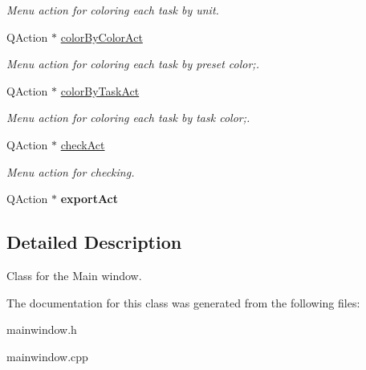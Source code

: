 \begin{DoxyCompactItemize}
\begin{DoxyCompactList}\small\item\em Menu action for coloring each task by unit. \end{DoxyCompactList}\item 
\hypertarget{class_main_window_afd6cf07dd21a8cde228102b8798ac49d}{}Q\+Action $\ast$ \hyperlink{class_main_window_afd6cf07dd21a8cde228102b8798ac49d}{color\+By\+Color\+Act}\label{class_main_window_afd6cf07dd21a8cde228102b8798ac49d}

\begin{DoxyCompactList}\small\item\em Menu action for coloring each task by preset color;. \end{DoxyCompactList}\item 
\hypertarget{class_main_window_a4c72320ca62b13088dc5ca562cba2761}{}Q\+Action $\ast$ \hyperlink{class_main_window_a4c72320ca62b13088dc5ca562cba2761}{color\+By\+Task\+Act}\label{class_main_window_a4c72320ca62b13088dc5ca562cba2761}

\begin{DoxyCompactList}\small\item\em Menu action for coloring each task by task color;. \end{DoxyCompactList}\item 
\hypertarget{class_main_window_ab6bb74007a03a6d6e97fa3b4c92cd0da}{}Q\+Action $\ast$ \hyperlink{class_main_window_ab6bb74007a03a6d6e97fa3b4c92cd0da}{check\+Act}\label{class_main_window_ab6bb74007a03a6d6e97fa3b4c92cd0da}

\begin{DoxyCompactList}\small\item\em Menu action for checking. \end{DoxyCompactList}\item 
\hypertarget{class_main_window_acb019ac85cd188f2738421da7095e932}{}Q\+Action $\ast$ {\bfseries export\+Act}\label{class_main_window_acb019ac85cd188f2738421da7095e932}

\end{DoxyCompactItemize}


\subsection{Detailed Description}
Class for the Main window. 

The documentation for this class was generated from the following files\+:\begin{DoxyCompactItemize}
\item 
mainwindow.\+h\item 
mainwindow.\+cpp\end{DoxyCompactItemize}

